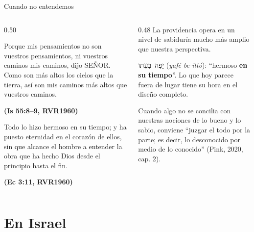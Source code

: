 \documentclass[hyperref={bookmarks=false},aspectratio=169]{beamer}
\newcommand{\heb}[1]{\mbox{\foreignlanguage{hebrew}{#1}}}
\newcommand{\SENOR}{S{\fontsize{0.78em}{1em}\selectfont EÑOR}}
\newcommand{\fuente}[1]{\par\hfill{\upshape\bfseries\footnotesize\textcolor{azul}{#1}}}
\newcommand{\destacar}[1]{\textbf{\textcolor{azul}{#1}}}
\begin{document}
\begin{frame}{Cuando no entendemos}
\begin{columns}[t,onlytextwidth]
\begin{column}{0.50\textwidth}
\begin{cita}Porque mis pensamientos no son vuestros pensamientos, ni vuestros caminos mis caminos, dijo \SENOR. Como son más altos los cielos que la tierra, así son mis caminos más altos que vuestros caminos.\fuente{(Is 55:8--9, RVR1960)}\end{cita}
\begin{cita}Todo lo hizo hermoso en su tiempo; y ha puesto eternidad en el corazón de ellos, sin que alcance el hombre a entender la obra que ha hecho Dios desde el principio hasta el fin.\fuente{(Ec 3:11, RVR1960)}\end{cita}
\end{column}
\begin{column}{0.48\textwidth}\small
La providencia opera en un nivel de sabiduría mucho más amplio que nuestra perspectiva.\par\medskip
\heb{יָפֶה בְעִתּוֹ} (\emph{yafé be-ittó}): ``hermoso \destacar{en su tiempo}''. Lo que hoy parece fuera de lugar tiene su hora en el diseño completo.\par\medskip
Cuando algo no se concilia con nuestras nociones de lo bueno y lo sabio, conviene ``juzgar el todo por la parte; es decir, lo desconocido por medio de lo conocido'' (Pink, 2020, cap. 2).
\end{column}
\end{columns}
\end{frame}

\section{En Israel}
\end{document}
